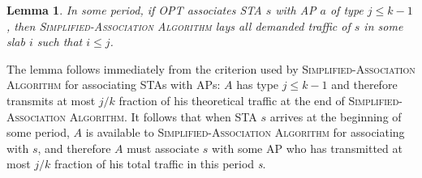 \documentclass[conference]{IEEEtran}
\newtheorem{lemma}{Lemma}
\begin{document}
  \begin{lemma}\label{le:type_slab}
    In some period, if OPT associates STA $s$ with AP $a$ of type $j\leq k-1$, then {\scshape Simplified-Association Algorithm} lays all demanded traffic of $s$ in some slab $i$ such that $i\leq j$.
  \end{lemma}

  The lemma follows immediately from the criterion used by {\scshape Simplified-Association Algorithm} for associating STAs with APs: $A$ has type $j\leq k-1$ and therefore transmits at most $j/k$ fraction of his theoretical traffic at the end of {\scshape Simplified-Association Algorithm}.  It follows that when STA $s$ arrives at the beginning of some period, $A$ is available to {\scshape Simplified-Association Algorithm} for associating with $s$,  and therefore $A$ must associate $s$ with some AP who has transmitted at most $j/k$ fraction of his total traffic in this period \textit{s}.
\end{document}

